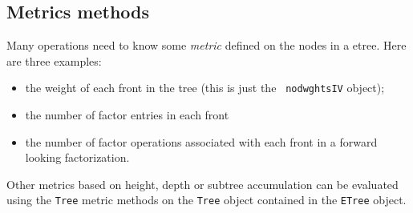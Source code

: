 \subsection{Metrics methods}
\label{subsection:ETree:proto:metrics}
\par
Many operations need to know some {\it metric} defined on the nodes
in a etree.
Here are three examples: 
\begin{itemize}
\item
the weight of each front in the tree (this is just the {\tt
nodwghtsIV} object);
\item
the number of factor entries in each front
\item
the number of factor operations associated with each front in a
forward looking factorization.
\end{itemize}
Other metrics based on height, depth or subtree accumulation
can be evaluated using the {\tt Tree} metric methods on the
{\tt Tree} object contained in the {\tt ETree} object.
\par
